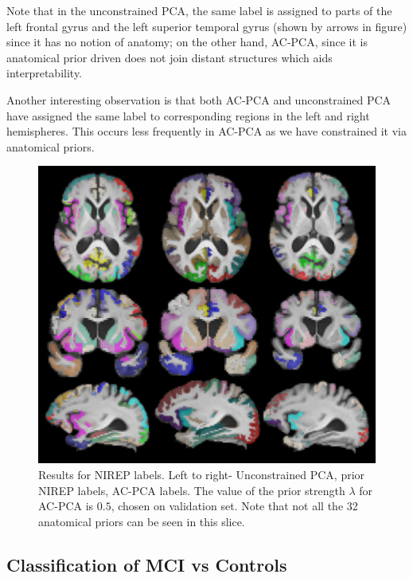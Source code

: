 \documentclass{llncs}
\begin{document}
Note that in the unconstrained PCA, the same label is assigned to parts of the left frontal gyrus and the left superior temporal gyrus (shown by arrows in figure) since it has no notion of anatomy; on the other hand, AC-PCA, since it is anatomical prior driven does not join distant structures which aids interpretability.

Another interesting observation is that both AC-PCA and unconstrained PCA have assigned  the same label to corresponding regions in the left and right hemispheres. This occurs less frequently in AC-PCA as we have constrained it via anatomical priors.  %


\begin{figure}
\begin{center}
\includegraphics[width=0.7\linewidth]{nirep.pdf} 
\end{center}
\vspace{-0.2in}
\caption{Results for NIREP labels. Left to right- Unconstrained PCA, prior NIREP labels, AC-PCA labels. The value of the prior strength $\lambda$ for AC-PCA is $0.5$, chosen on validation set. Note that not all the 32 anatomical priors can be seen in this slice.}
\label{fig:priornirep}
\end{figure}


\subsection{Classification of MCI vs Controls}
\end{document}
